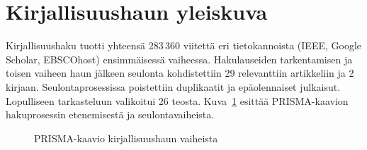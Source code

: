 \documentclass[bscthesis,finnish,oneside,biblatex]{uefcsthesis}
\begin{document}
\section{Kirjallisuushaun yleiskuva}

Kirjallisuushaku tuotti yhteensä 283\,360 viitettä eri tietokannoista (IEEE, Google Scholar, EBSCOhost) ensimmäisessä vaiheessa.
Hakulauseiden tarkentamisen ja toisen vaiheen haun jälkeen seulonta kohdistettiin 29 relevanttiin artikkeliin ja 2 kirjaan.
Seulontaprosessissa poistettiin duplikaatit ja epäolennaiset julkaisut. Lopulliseen tarkasteluun valikoitui 26 teosta.
Kuva~\ref{fig:prisma} esittää PRISMA-kaavion hakuprosessin etenemisestä ja seulontavaiheista.


\begin{figure}[h]
  \centering
  \caption{PRISMA-kaavio kirjallisuushaun vaiheista}
  \label{fig:prisma}
\end{figure}
\end{document}
